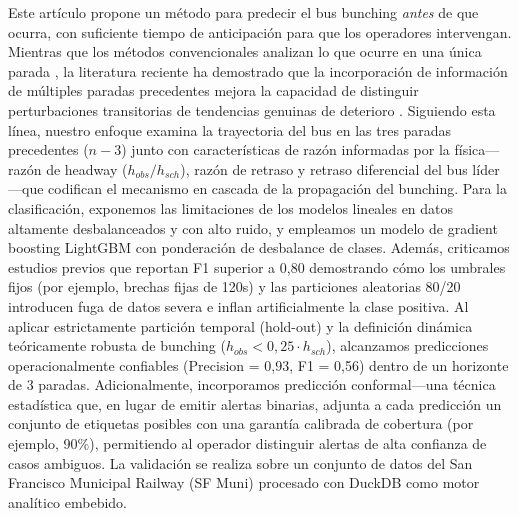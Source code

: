 \documentclass[fleqn,10pt,lineno]{wlpeerj}
\begin{document}
Este art\'iculo propone un m\'etodo para predecir el bus bunching \textit{antes} de que ocurra, con suficiente tiempo de anticipaci\'on para que los operadores intervengan. Mientras que los m\'etodos convencionales analizan lo que ocurre en una \'unica parada \citep{8}, la literatura reciente ha demostrado que la incorporaci\'on de informaci\'on de m\'ultiples paradas precedentes mejora la capacidad de distinguir perturbaciones transitorias de tendencias genuinas de deterioro \citep{3,15}. Siguiendo esta l\'inea, nuestro enfoque examina la trayectoria del bus en las tres paradas precedentes ($n{-}3$) junto con caracter\'isticas de raz\'on informadas por la f\'isica---raz\'on de headway ($h_{obs}/h_{sch}$), raz\'on de retraso y retraso diferencial del bus l\'ider---que codifican el mecanismo en cascada de la propagaci\'on del bunching. Para la clasificaci\'on, exponemos las limitaciones de los modelos lineales en datos altamente desbalanceados y con alto ruido, y empleamos un modelo de gradient boosting LightGBM con ponderaci\'on de desbalance de clases. Adem\'as, criticamos estudios previos que reportan F1 superior a 0,80 demostrando c\'omo los umbrales fijos (por ejemplo, brechas fijas de 120s) y las particiones aleatorias 80/20 introducen fuga de datos severa e inflan artificialmente la clase positiva. Al aplicar estrictamente partici\'on temporal (hold-out) y la definici\'on din\'amica te\'oricamente robusta de bunching ($h_{obs} < 0,25 \cdot h_{sch}$), alcanzamos predicciones operacionalmente confiables (Precision = 0,93, F1 = 0,56) dentro de un horizonte de 3 paradas. Adicionalmente, incorporamos predicci\'on conformal---una t\'ecnica estad\'istica que, en lugar de emitir alertas binarias, adjunta a cada predicci\'on un conjunto de etiquetas posibles con una garant\'ia calibrada de cobertura (por ejemplo, 90\%), permitiendo al operador distinguir alertas de alta confianza de casos ambiguos. La validaci\'on se realiza sobre un conjunto de datos del San Francisco Municipal Railway (SF Muni) procesado con DuckDB \citep{14} como motor anal\'itico embebido.
\end{document}

